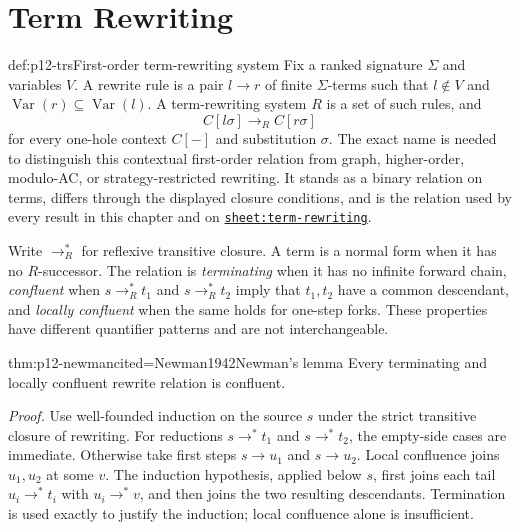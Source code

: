 \chapter{Term Rewriting}\label{sec:p12-rewriting}

\begin{hbdefinition}{def:p12-trs}{First-order term-rewriting system}
Fix a ranked signature \(\Sigma\) and variables \(V\). A rewrite rule is a
pair \(l\to r\) of finite \(\Sigma\)-terms such that \(l\notin V\) and
\(\operatorname{Var}(r)\subseteq\operatorname{Var}(l)\). A term-rewriting
system \(R\) is a set of such rules, and
\[
 C[l\sigma]\to_R C[r\sigma]
\]
for every one-hole context \(C[-]\) and substitution \(\sigma\). The exact
name is needed to distinguish this contextual first-order relation from graph,
higher-order, modulo-AC, or strategy-restricted rewriting. It stands as a
binary relation on terms, differs through the displayed closure conditions,
and is the relation used by every result in this chapter and on
\hyperref[sheet:term-rewriting]{\texttt{sheet:term-rewriting}}.
\end{hbdefinition}

Write \(\to_R^*\) for reflexive transitive closure. A term is a normal form
when it has no \(R\)-successor. The relation is \emph{terminating} when it has
no infinite forward chain, \emph{confluent} when
\(s\to_R^*t_1\) and \(s\to_R^*t_2\) imply that \(t_1,t_2\) have a common
descendant, and \emph{locally confluent} when the same holds for one-step
forks. These properties have different quantifier patterns and are not
interchangeable.

\begin{hbtheorem}{thm:p12-newman}{cited=Newman1942}{Newman's lemma}
Every terminating and locally confluent rewrite relation is confluent.
\end{hbtheorem}

\noindent\emph{Proof.}
Use well-founded induction on the source \(s\) under the strict transitive
closure of rewriting. For reductions
\(s\to^*t_1\) and \(s\to^*t_2\), the empty-side cases are immediate.
Otherwise take first steps \(s\to u_1\) and \(s\to u_2\). Local confluence
joins \(u_1,u_2\) at some \(v\). The induction hypothesis, applied below
\(s\), first joins each tail \(u_i\to^*t_i\) with \(u_i\to^*v\), and then
joins the two resulting descendants. Termination is used exactly to justify
the induction; local confluence alone is insufficient.


